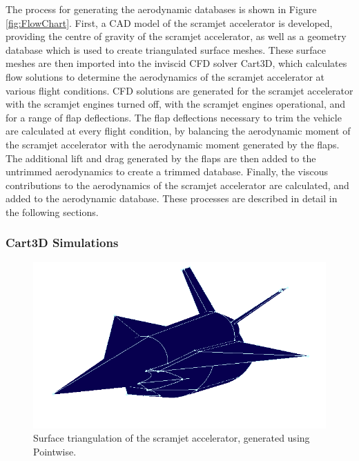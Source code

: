 The process for generating the aerodynamic databases is shown in Figure \ref{fig:FlowChart}. First, a CAD model of the scramjet accelerator is developed, providing the centre of gravity of the scramjet accelerator, as well as a geometry database which is used to create triangulated surface meshes. These surface meshes are then imported into the inviscid CFD solver Cart3D\cite{CART3D}, which calculates flow solutions to determine the aerodynamics of the scramjet accelerator at various flight conditions. CFD solutions are generated for the scramjet accelerator with the scramjet engines turned off, with the scramjet engines operational, and for a range of flap deflections. 
The flap deflections necessary to trim the vehicle are calculated at every flight condition, by balancing the aerodynamic moment of the scramjet accelerator with the aerodynamic moment generated by the flaps. 
The additional lift and drag generated by the flaps are then added to the untrimmed aerodynamics to create a trimmed database.
Finally, the viscous contributions to the aerodynamics of the scramjet accelerator are calculated, and added to the aerodynamic database. These processes are described in detail in the following sections. 







\subsubsection{Cart3D Simulations}\label{sec:cart3d}


\begin{figure}[ht]
	\centering
	\includegraphics[width=0.6\linewidth]{figures/3_vehicle_design/Pointwise}
	\caption{Surface triangulation of the scramjet accelerator, generated using Pointwise\cite{Pointwise}.}
	\label{fig:Pointwise}
\end{figure}

